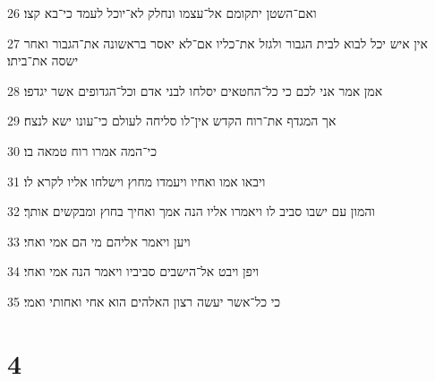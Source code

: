 \par 26 ואם־השטן יתקומם אל־עצמו ונחלק לא־יוכל לעמד כי־בא קצו׃
\par 27 אין איש יכל לבוא לבית הגבור ולגזל את־כליו אם־לא יאסר בראשונה את־הגבור ואחר ישסה את־ביתו׃
\par 28 אמן אמר אני לכם כי כל־החטאים יסלחו לבני אדם וכל־הגדופים אשר יגדפו׃
\par 29 אך המגדף את־רוח הקדש אין־לו סליחה לעולם כי־עונו ישא לנצח׃
\par 30 כי־המה אמרו רוח טמאה בו׃
\par 31 ויבאו אמו ואחיו ויעמדו מחוץ וישלחו אליו לקרא לו׃
\par 32 והמון עם ישבו סביב לו ויאמרו אליו הנה אמך ואחיך בחוץ ומבקשים אותך׃
\par 33 ויען ויאמר אליהם מי הם אמי ואחי׃
\par 34 ויפן ויבט אל־הישבים סביביו ויאמר הנה אמי ואחי׃
\par 35 כי כל־אשר יעשה רצון האלהים הוא אחי ואחותי ואמי׃

\chapter{4}

